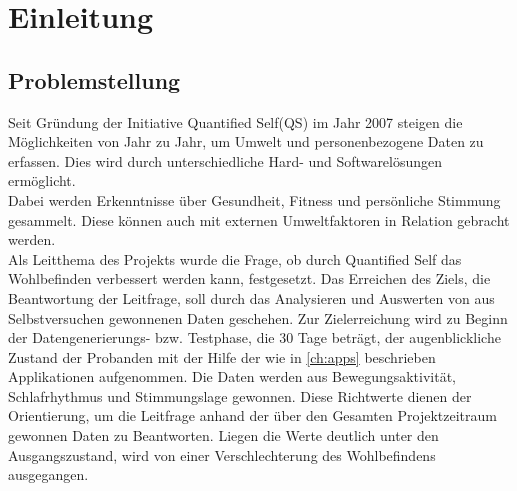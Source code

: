 
\chapter{Einleitung}
\label{ch:Einleitung}

\section{Problemstellung}
\label{ch:Einleitung:sec:Problemstellung}

Seit Gründung der Initiative Quantified Self(QS)\cite{web:QS} im Jahr 2007\cite{web:QSJahr} steigen die Möglichkeiten von Jahr zu Jahr, um Umwelt und personenbezogene Daten zu erfassen. \cite{web:Tracking} 
Dies wird durch unterschiedliche Hard- und Softwarelösungen ermöglicht. \\
Dabei werden Erkenntnisse über Gesundheit, Fitness und persönliche Stimmung gesammelt.
Diese können auch mit externen Umweltfaktoren in Relation gebracht werden. \\
Als Leitthema des Projekts wurde die Frage, ob durch Quantified Self das Wohlbefinden verbessert werden kann, festgesetzt. 
Das Erreichen des Ziels, die Beantwortung der Leitfrage, soll durch das Analysieren und Auswerten von aus Selbstversuchen gewonnenen Daten geschehen.
Zur Zielerreichung wird zu Beginn der Datengenerierungs- bzw. Testphase, die 30 Tage beträgt, der augenblickliche Zustand der Probanden mit der Hilfe der wie in \ref{ch:apps} beschrieben Applikationen aufgenommen. 
Die Daten werden aus Bewegungsaktivität, Schlafrhythmus und Stimmungslage gewonnen.
Diese Richtwerte dienen der Orientierung, um die Leitfrage anhand der über den Gesamten Projektzeitraum gewonnen Daten zu Beantworten. 
Liegen die Werte deutlich unter den Ausgangszustand, wird von einer Verschlechterung des Wohlbefindens ausgegangen. \\
